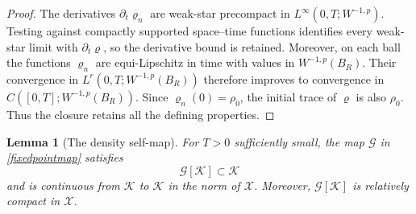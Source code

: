 \documentclass[11pt]{article}
\newtheorem{lemma}[theorem]{Lemma}
\begin{document}
\begin{proof}
The derivatives $\partial_t\varrho_n$ are weak-star precompact in
$L^\infty(0,T;W^{-1,p})$.  Testing against compactly supported
space--time functions identifies every weak-star limit with
$\partial_t\varrho$, so the derivative bound is retained.  Moreover, on
each ball the functions $\varrho_n$ are equi-Lipschitz in time with values
in $W^{-1,p}(B_R)$.  Their convergence in
$L^r(0,T;W^{-1,p}(B_R))$ therefore improves to convergence in
$C([0,T];W^{-1,p}(B_R))$.  Since $\varrho_n(0)=\rho_0$, the initial trace
of $\varrho$ is also $\rho_0$.  Thus the closure retains all the defining
properties.
\end{proof}

\begin{lemma}[The density self-map]\label{lem:selfmap}
For $T>0$ sufficiently small, the map $\mathcal G$ in
\eqref{fixedpointmap} satisfies
\begin{equation*}
 \mathcal G[\mathcal K]\subset\mathcal K
\end{equation*}
and is continuous from $\mathcal K$ to $\mathcal K$ in
the norm of $\mathcal X$.  Moreover, $\mathcal G[\mathcal K]$ is relatively
compact in $\mathcal X$.
\end{lemma}
\end{document}
